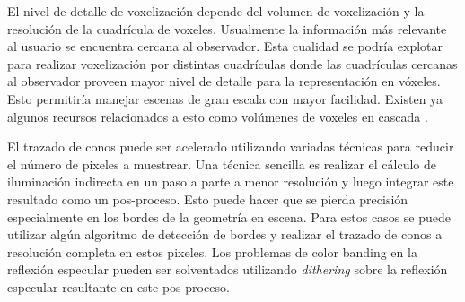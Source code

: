 El nivel de detalle de voxelización depende del volumen de voxelización y la resolución de la cuadrícula de voxeles. Usualmente la información más relevante al usuario se encuentra cercana al observador. Esta cualidad se podría explotar para realizar voxelización por distintas cuadrículas donde las cuadrículas cercanas al observador proveen mayor nivel de detalle para la representación en vóxeles. Esto permitiría manejar escenas de gran escala con mayor facilidad. Existen ya algunos recursos relacionados a esto como volúmenes de voxeles en cascada \cite{McLaren:2015:TCL:2775280.2792546}.

El trazado de conos puede ser acelerado utilizando variadas técnicas para reducir el número de pixeles a muestrear. Una técnica sencilla es realizar el cálculo de iluminación indirecta en un paso a parte a menor resolución y luego integrar este resultado como un pos-proceso. Esto puede hacer que se pierda precisión especialmente en los bordes de la geometría en escena. Para estos casos se puede utilizar algún algoritmo de detección de bordes y realizar el trazado de conos a resolución completa en estos pixeles. Los problemas de color banding en la reflexión especular pueden ser solventados utilizando \emph{dithering} sobre la reflexión especular resultante en este pos-proceso.
